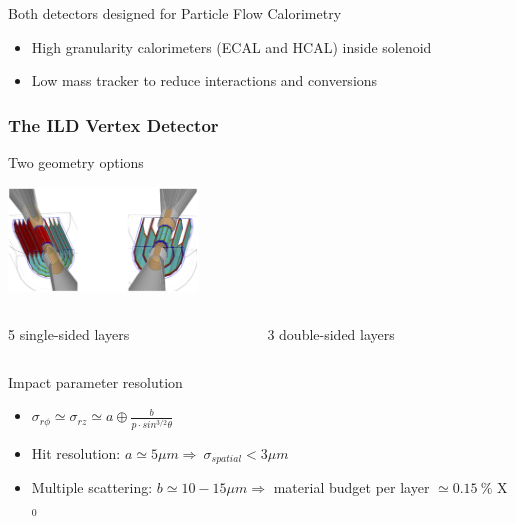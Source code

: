 \documentclass{beamer}
\begin{document}
\begin{frame}
  \vspace{-0.2cm}
  \begin{block}{Both detectors designed for Particle Flow Calorimetry}
    \footnotesize{
    \begin{itemize}
      \item High granularity calorimeters (ECAL and HCAL) inside solenoid
        \vspace{-0.1cm}
      \item Low mass tracker to reduce interactions and conversions
    \end{itemize}
    }
  \end{block}

\end{frame}
  
  \begin{frame}[label=vxd]
    \frametitle{The ILD Vertex Detector}

    \vspace{-0.3cm}
    \begin{block}{Two geometry options}
      \begin{center}
        \includegraphics[width = 6 cm,height = 2.8cm]{Pictures/ild_VXD.png}
      \end{center}
      \vspace{-0.5cm}
      \begin{columns}[t]
        \begin{column}{3cm}
          5 single-sided layers
        \end{column}
        \begin{column}{3cm}
          3 double-sided layers
        \end{column}
      \end{columns}
    \end{block}

    \vspace{-0.2cm}
    \begin{alertblock}{Impact parameter resolution}
        \begin{itemize}
            \item $\sigma_{r\phi} \simeq \sigma_{rz} \simeq a \oplus \frac{b}{p \cdot sin^{3/2} \theta}$
            \item Hit resolution: $a \simeq 5 \mu m \Rightarrow ~ \sigma_{spatial} < 3 \mu m$
            \item Multiple scattering: $b \simeq 10 - 15 \mu m \Rightarrow$ material budget per layer $\simeq 0.15~\%$ X$_0$ 
        \end{itemize}


\end{alertblock}
\end{frame}
\end{document}

